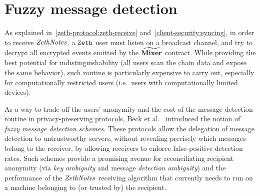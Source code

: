 
\chapter{Fuzzy message detection}\label{appendix:fmd}

As explained in~\ref{zeth-protocol:zeth-receive} and~\ref{client-security:syncing}, in order to receive $\mathit{ZethNotes}$, a $\texttt{Zeth}$ user must listen on a broadcast channel, and try to decrypt all encrypted events emitted by the $\widetilde{\mathbf{Mixer}}$ contract. While providing the best potential for indistinguishability (all users scan the chain data and expose the same behavior), such routine is particularly expensive to carry out, especially for computationally restricted users (i.e.~users with computationally limited devices).

As a way to trade-off the users' anonymity and the cost of the message detection routine in privacy-preserving protocols, Beck et al.~\cite{DBLP:journals/iacr/BeckLMG21} introduced the notion of \emph{fuzzy message detection schemes}. These protocols allow the delegation of message detection to untrustworthy servers, without revealing precisely which messages belong to the receiver, by allowing receivers to enforce false-positive detection rates.
Such schemes provide a promising avenue for reconciliating recipient anonymity (via \emph{key ambiguity} and message \emph{detection ambiguity}) and the performance of the $\mathit{ZethNotes}$ receiving algorithm that currently needs to run on a machine belonging to (or trusted by) the recipient.

